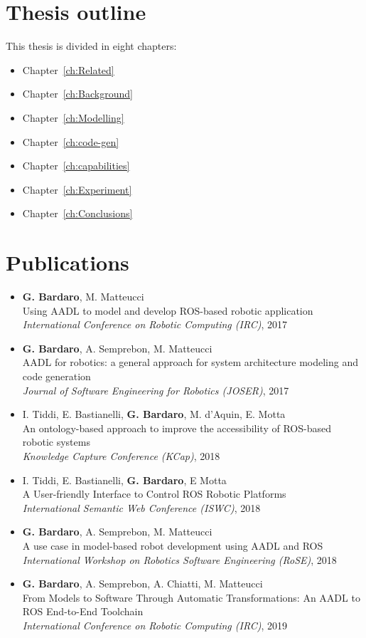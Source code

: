 \section{Thesis outline}
This thesis is divided in eight chapters:
\begin{itemize}
\item Chapter~\ref{ch:Related}
\item Chapter~\ref{ch:Background}
\item Chapter~\ref{ch:Modelling}
\item Chapter~\ref{ch:code-gen}
\item Chapter~\ref{ch:capabilities}
\item Chapter~\ref{ch:Experiment}
\item Chapter~\ref{ch:Conclusions}
\end{itemize}

\section{Publications}
\begin{itemize}
\item \textbf{G. Bardaro}, M. Matteucci \\
Using AADL to model and develop ROS-based robotic application~\cite{bardaro2017using} \\
\textit{International Conference on Robotic Computing (IRC)}, 2017
\item \textbf{G. Bardaro}, A. Semprebon, M. Matteucci \\
AADL for robotics: a general approach for system architecture modeling and code generation~\cite{bardaro2017aadl} \\
\textit{Journal of Software Engineering for Robotics (JOSER)}, 2017
\item I. Tiddi, E. Bastianelli, \textbf{G. Bardaro}, M. d'Aquin, E. Motta \\
An ontology-based approach to improve the accessibility of ROS-based robotic systems~\cite{tiddi2017ontology} \\
\textit{Knowledge Capture Conference (KCap)}, 2018 \\
\item I. Tiddi, E. Bastianelli, \textbf{G. Bardaro}, E Motta \\
A User-friendly Interface to Control ROS Robotic Platforms~\cite{tiddi2018user} \\
\textit{International Semantic Web Conference (ISWC)}, 2018
\item \textbf{G. Bardaro}, A. Semprebon, M. Matteucci \\
A use case in model-based robot development using AADL and ROS~\cite{bardaro2018use} \\
\textit{International Workshop on Robotics Software Engineering (RoSE)}, 2018
\item \textbf{G. Bardaro}, A. Semprebon, A. Chiatti, M. Matteucci \\
From Models to Software Through Automatic Transformations: An AADL to ROS End-to-End Toolchain~\cite{bardaro2019models} \\
\textit{International Conference on Robotic Computing (IRC)}, 2019
\end{itemize}

